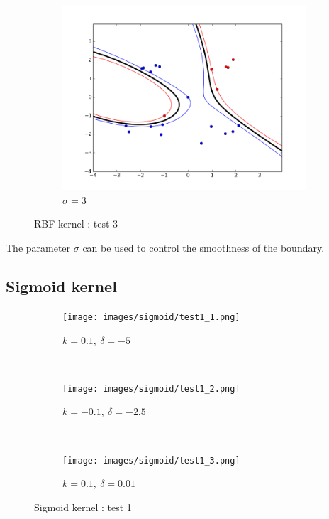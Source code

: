 \documentclass{article}
\begin{document}
\begin{figure}[!h]
\begin{subfigure}[b]{0.3\textwidth}
        \includegraphics[width=1.2\textwidth]{images/rbf/3/figure_3.png}
        \caption{$\sigma = 3$}  \label{rbf_3_figure_3}
    \end{subfigure}
    \caption{RBF kernel : test 3}
    \label{rbf_3}
\end{figure}


The parameter $\sigma$ can be used to control the smoothness of the boundary.

\newpage
\subsection{Sigmoid kernel}
\begin{figure}[!h]
    \centering
    \begin{subfigure}[b]{0.3\textwidth}
        \texttt{[image: images/sigmoid/test1\_1.png]}
        \caption{$k  = 0.1,~\delta = -5$} \label{sigmoid_1_figure_1}
    \end{subfigure}
    ~ 
    \begin{subfigure}[b]{0.3\textwidth}
        \texttt{[image: images/sigmoid/test1\_2.png]}
        \caption{$k  = -0.1,~\delta = -2.5$}  \label{sigmoid_1_figure_2}
    \end{subfigure}
     ~ 
    \begin{subfigure}[b]{0.3\textwidth}
        \texttt{[image: images/sigmoid/test1\_3.png]}
        \caption{$k  = 0.1,~\delta = 0.01$}  \label{sigmoid_1_figure_3}
    \end{subfigure}
    \caption{Sigmoid kernel : test 1}
    \label{rbf_1}
\end{figure}
\end{document}
